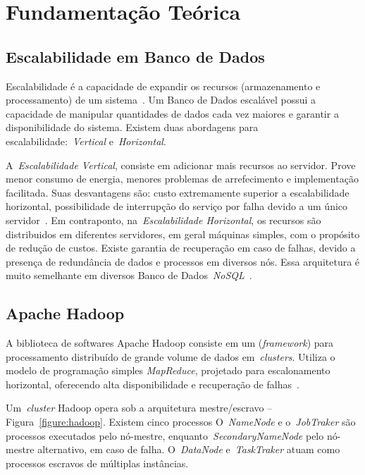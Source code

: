 \documentclass[12pt]{article}
\begin{document}
\section{Fundamentação Teórica}
\label{sec:fundamentacao}

\subsection{Escalabilidade em Banco de Dados}
\label{subsec:escalabilidade}

Escalabilidade é a capacidade de expandir os recursos (armazenamento e processamento) de um sistema~\cite{elmasri2010fundamentals}. Um Banco de Dados escalável possui a capacidade de manipular quantidades de dados cada vez maiores e garantir a disponibilidade do sistema. Existem duas abordagens para escalabilidade:~\emph{Vertical} e~\emph{Horizontal}.

A~\emph{Escalabilidade Vertical}, consiste em adicionar mais recursos ao servidor. Prove menor consumo de energia, menores problemas de arrefecimento e implementação facilitada. Suas desvantagens são: custo extremamente superior a escalabilidade horizontal, possibilidade de interrupção do serviço por falha devido a um único servidor~\cite{hwang2014scale}. Em contraponto, na~\emph{Escalabilidade Horizontal}, os recursos são distribuidos em diferentes servidores, em geral máquinas simples, com o propósito de redução de custos. Existe garantia de recuperação em caso de falhas, devido a presença de redundância de dados e processos em diversos nós. Essa arquitetura é muito semelhante em diversos Banco de Dados~\textit{NoSQL}~\cite{hwang2014scale}.

\subsection{Apache Hadoop}
\label{subsection:hadoop}

A biblioteca de softwares Apache Hadoop consiste em um (\textit{framework}) para processamento distribuído de grande volume de dados em~\emph{clusters}. Utiliza o modelo de programação simples \emph{MapReduce}, projetado para escalonamento horizontal, oferecendo alta disponibilidade e recuperação de falhas~\cite{hadoophbase}.

Um~\emph{cluster} Hadoop opera sob a arquitetura mestre/escravo -- Figura~\ref{figure:hadoop}. Existem cinco processos O~\emph{NameNode} e o~\emph{JobTraker} são processos executados pelo nó-mestre, enquanto~\emph{SecondaryNameNode} pelo nó-mestre alternativo, em caso de falha. O~\emph{DataNode} e~\emph{TaskTraker} atuam como processos escravos de múltiplas instâncias. %
\end{document}
